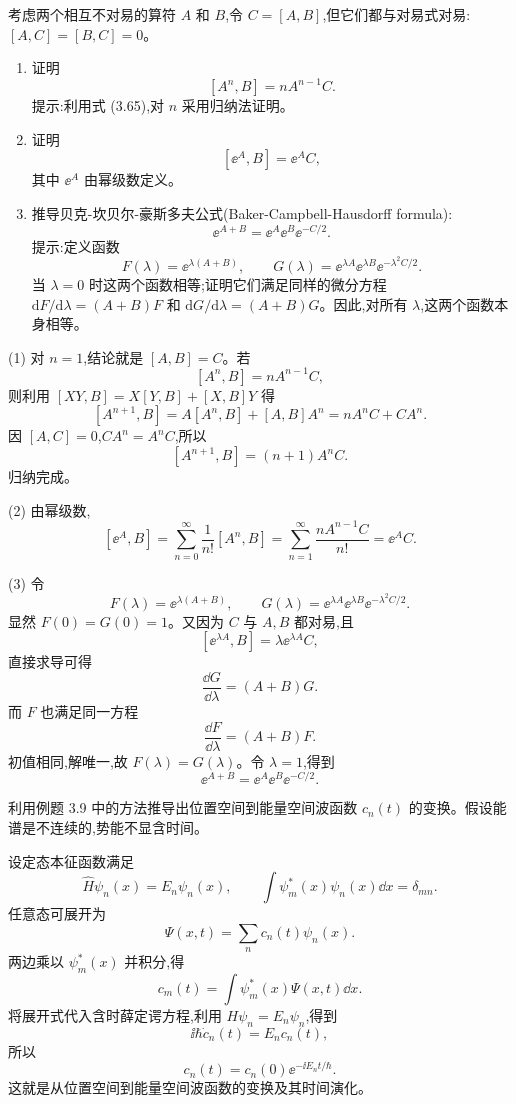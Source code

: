 \begin{question}
考虑两个相互不对易的算符 $A$ 和 $B$,令 $C=[A,B]$,但它们都与对易式对易:$[A,C]=[B,C]=0$。
\begin{enumerate}
\item 证明
\[
[A^n,B]=nA^{n-1}C.
\]
提示:利用式 (3.65),对 $n$ 采用归纳法证明。
\item 证明
\[
[\mathrm \ee^A,B]=\mathrm \ee^A C,
\]
其中 $\mathrm \ee^A$ 由幂级数定义。
\item 推导贝克-坎贝尔-豪斯多夫公式(Baker-Campbell-Hausdorff formula):
\[
\mathrm \ee^{A+B}=\mathrm \ee^A\mathrm \ee^B\mathrm \ee^{-C/2}.
\]
提示:定义函数
\[
F(\lambda)=\mathrm \ee^{\lambda(A+B)},\qquad
G(\lambda)=\mathrm \ee^{\lambda A}\mathrm \ee^{\lambda B}\mathrm \ee^{-\lambda^2C/2}.
\]
当 $\lambda=0$ 时这两个函数相等;证明它们满足同样的微分方程 $\mathrm dF/\mathrm d\lambda=(A+B)F$ 和 $\mathrm dG/\mathrm d\lambda=(A+B)G$。因此,对所有 $\lambda$,这两个函数本身相等。
\end{enumerate}

\par\smallskip
{}

\begin{solution}
(1) 对 $n=1$,结论就是 $[A,B]=C$。若
\[
[A^n,B]=nA^{n-1}C,
\]
则利用 $[XY,B]=X[Y,B]+[X,B]Y$ 得
\[
[A^{n+1},B]=A[A^n,B]+[A,B]A^n
=nA^nC+CA^n.
\]
因 $[A,C]=0$,$CA^n=A^nC$,所以
\[
[A^{n+1},B]=(n+1)A^nC.
\]
归纳完成。

(2) 由幂级数,
\[
[\ee^A,B]=\sum_{n=0}^{\infty}\frac1{n!}[A^n,B]
=\sum_{n=1}^{\infty}\frac{nA^{n-1}C}{n!}
=\ee^A C.
\]

(3) 令
\[
F(\lambda)=\ee^{\lambda(A+B)},
\qquad
G(\lambda)=\ee^{\lambda A}\ee^{\lambda B}\ee^{-\lambda^2C/2}.
\]
显然 $F(0)=G(0)=1$。又因为 $C$ 与 $A,B$ 都对易,且
\[
[\ee^{\lambda A},B]=\lambda \ee^{\lambda A}C,
\]
直接求导可得
\[
\frac{\dd G}{\dd\lambda}=(A+B)G.
\]
而 $F$ 也满足同一方程
\[
\frac{\dd F}{\dd\lambda}=(A+B)F.
\]
初值相同,解唯一,故 $F(\lambda)=G(\lambda)$。令 $\lambda=1$,得到
\[
\boxed{\ee^{A+B}=\ee^A\ee^B\ee^{-C/2}.}
\]
\end{solution}
\end{question}

\begin{question}
利用例题 3.9 中的方法推导出位置空间到能量空间波函数 $c_n(t)$ 的变换。假设能谱是不连续的,势能不显含时间。
\begin{solution}
设定态本征函数满足
\[
\hat H\psi_n(x)=E_n\psi_n(x),
\qquad
\int\psi_m^*(x)\psi_n(x)\dd x=\delta_{mn}.
\]
任意态可展开为
\[
\Psi(x,t)=\sum_n c_n(t)\psi_n(x).
\]
两边乘以 $\psi_m^*(x)$ 并积分,得
\[
\boxed{c_m(t)=\int\psi_m^*(x)\Psi(x,t)\dd x.}
\]
将展开式代入含时薛定谔方程,利用 $H\psi_n=E_n\psi_n$,得到
\[
\ii\hbar\dot c_n(t)=E_n c_n(t),
\]
所以
\[
\boxed{c_n(t)=c_n(0)\ee^{-\ii E_nt/\hbar}.}
\]
这就是从位置空间到能量空间波函数的变换及其时间演化。
\end{solution}
\end{question}

